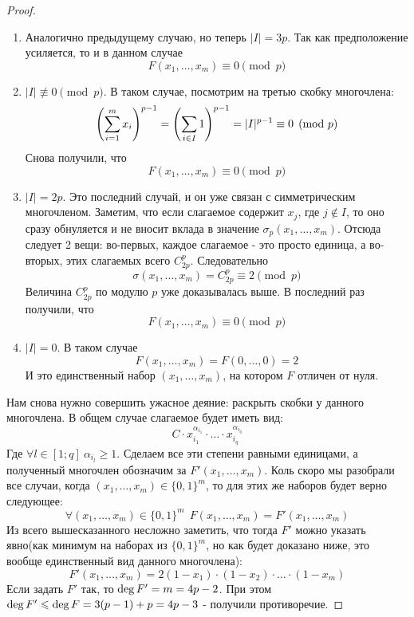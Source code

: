 \begin{proof}
\begin{enumerate}
		\item Аналогично предыдущему случаю, но теперь $|I| = 3p$. Так как предположение усиляется, то и в данном случае
		\[
			F(x_1, \ldots, x_m) \equiv 0 \pmod p
		\]
		
		\item $|I| \not\equiv 0 \pmod p$. В таком случае, посмотрим на третью скобку многочлена:
		\[
			\left(\sum\limits_{i = 1}^m x_i\right)^{p - 1} = \left(\sum\limits_{i \in I} 1\right)^{p - 1} = |I|^{p - 1} \equiv 0 \pmod p
		\]
		Снова получили, что
		\[
			F(x_1, \ldots, x_m) \equiv 0 \pmod p
		\]
		
		\item $|I| = 2p$. Это последний случай, и он уже связан с симметрическим многочленом. Заметим, что если слагаемое содержит $x_j$, где $j \notin I$, то оно сразу обнуляется и не вносит вклада в значение $\sigma_p(x_1, \ldots, x_m)$. Отсюда следует 2 вещи: во-первых, каждое слагаемое - это просто единица, а во-вторых, этих слагаемых всего $C_{2p}^p$. Следовательно
		\[
			\sigma(x_1, \ldots, x_m) = C_{2p}^p \equiv 2 \pmod p
		\]
		Величина $C_{2p}^p$ по модулю $p$ уже доказывалась выше. В последний раз получили, что
		\[
			F(x_1, \ldots, x_m) \equiv 0 \pmod p
		\]
		
		\item $|I| = 0$. В таком случае
		\[
			F(x_1, \ldots, x_m) = F(0, \ldots, 0) = 2
		\]
		И это единственный набор $(x_1, \ldots, x_m)$, на котором $F$ отличен от нуля.
	\end{enumerate}
	Нам снова нужно совершить ужасное деяние: раскрыть скобки у данного многочлена. В общем случае слагаемое будет иметь вид:
	\[
		C \cdot x_{i_1}^{\alpha_{i_1}} \cdot \ldots \cdot x_{i_q}^{\alpha_{i_q}}
	\]
	Где $\forall l \in [1; q]\ \alpha_{i_l} \ge 1$. Сделаем все эти степени равными единицами, а полученный многочлен обозначим за $F'(x_1, \ldots, x_m)$. Коль скоро мы разобрали все случаи, когда $(x_1, \ldots, x_m) \in \{0, 1\}^m$, то для этих же наборов будет верно следующее:
	\[
		\forall (x_1, \ldots, x_m) \in \{0, 1\}^m\ \ F(x_1, \ldots, x_m) = F'(x_1, \ldots, x_m)
	\]
	Из всего вышесказанного несложно заметить, что тогда $F'$ можно указать явно(как минимум на наборах из $\{0, 1\}^m$, но как будет доказано ниже, это вообще единственный вид данного многочлена):
	\[
		F'(x_1, \ldots, x_m) = 2(1 - x_1) \cdot (1 - x_2) \cdot \ldots \cdot (1 - x_m)
	\]
	Если задать $F'$ так, то $\operatorname{deg} F' = m = 4p - 2$. При этом $\operatorname{deg} F' \leqslant \operatorname{deg} F = 3(p - 1) + p = 4p - 3$ - получили противоречие.
\end{proof}

